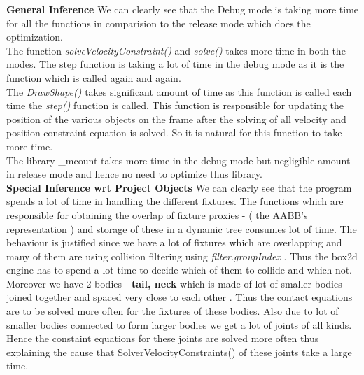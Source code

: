 \documentclass[11pt]{article}
\begin{document}
\textbf{General Inference}
We can clearly see that the Debug mode is taking more time for all the functions in comparision to the release mode which does the optimization.\\
The function \emph{solveVelocityConstraint()} and \emph{solve()} takes more time in both the modes.
The step function is taking a lot of time in the debug mode as it is the function which is called again and again. \\
The \emph{DrawShape()} takes significant amount of time as this function is called each time the \emph{step()} function is called.
This function is responsible for updating the position of the various objects on the frame after the solving of all velocity and position 
constraint equation is solved. So it is natural for this function to take more time. \\
The library \_mcount takes more time in the debug mode but negligible amount in release mode and hence no need to optimize thus library.\\

\textbf{Special Inference wrt Project Objects}
We can clearly see that the program spends a lot of time in handling the different fixtures.
The functions which are responsible for obtaining the overlap of fixture proxies - ( the AABB's representation ) and storage
of these in a dynamic tree consumes lot of time. 
The behaviour is justified since we have a lot of fixtures which are overlapping and many of them are using collision filtering
using \emph{filter.groupIndex} . Thus the box2d engine has to spend a lot time to decide which of them to collide and which not.
Moreover we have 2 bodies - \textbf{tail, neck} which is made of lot of smaller bodies joined together and spaced very close to each other .
Thus the contact equations are to be solved more often for the fixtures of these bodies.
Also due to lot of smaller bodies connected to form larger bodies we get a lot of joints of all kinds. Hence the constaint equations for 
these joints are solved more often thus explaining the cause that SolverVelocityConstraints() of these joints take a large time.
\end{document}
